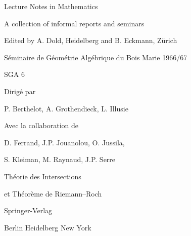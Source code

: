 \begin{center}
{\Large Lecture Notes in Mathematics}\par
A collection of informal reports and seminars\par
Edited by A. Dold, Heidelberg and B. Eckmann, Zürich\par
{}\par
\bigskip
Séminaire de Géométrie Algébrique du Bois Marie 1966/67\par
SGA 6\par
Dirigé par\par
P. Berthelot, A. Grothendieck, L. Illusie\par
Avec la collaboration de\par
D. Ferrand, J.P. Jouanolou, O. Jussila,\par
S. Kleiman, M. Raynaud, J.P. Serre\par
\bigskip
{\Large Théorie des Intersections\par
et Théorème de Riemann--Roch}\par
\bigskip
Springer-Verlag\par
Berlin \textperiodcentered{} Heidelberg \textperiodcentered{} New York
\end{center}


